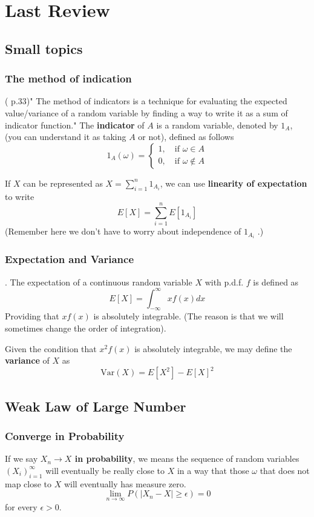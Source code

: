\chapter{Last Review}
\section*{Small topics}
\subsection*{The method of indication}
(\cite{Und_Chatterjee} p.33)" The method of indicators is a technique for evaluating the expected value/variance of a random variable by finding a way to write it as a sum of indicator function."
The \textbf{indicator} of \(A\) is a random variable, denoted by \(1_A\), (you can understand it as taking \(A\) or not), defined as follows  
\[
    1_A(\omega) = \begin{cases} 1, \quad \text{if } \omega \in A \\ 0,\quad \text{if } \omega \notin A \end{cases}
\]

If \(X\) can be represented as \(X = \sum_{i=1}^{n} 1_{A_i}\), we can use \textbf{linearity of expectation} to write 
\[
    E[X] = \sum_{i=1}^{n} E[1_{A_i}]
\]  
(Remember here we don't have to worry about independence of \(1_{A_i}\) .)
\subsection*{Expectation and Variance}. 
The expectation of a continuous random variable \(X\) with p.d.f. \(f\) is defined as 
\[
    E[X] = \int_{-\infty }^{\infty } x f(x)dx
\] 
Providing that \(xf(x)\) is absolutely integrable. (The reason is that we will sometimes change the order of integration). 

Given the condition that  \(x^2 f(x)\) is absolutely integrable, we may define the \textbf{variance} of \(X\) as 
\[
    \text{Var}(X) = E[X^{2} ] - E[X]^2 
\]

\section{Weak Law of Large Number}
\subsection*{Converge in Probability}
If we say \textbf{ \(X_n \to X\) in probability}, we means the sequence of random variables \((X_i)_{i=1}^\infty\) will eventually be really close to \(X\) in a way that
those \(\omega \) that does not map close to \(X\) will eventually has measure zero. 
\[
    \lim\limits_{n \to \infty} P(|X_n -X| \geq \epsilon  ) = 0
\]    
for every \(\epsilon >0\). 
